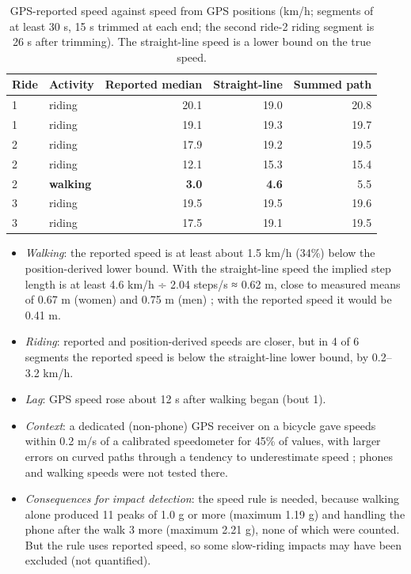 \begin{table}[htbp]
\centering\small
\caption{GPS-reported speed against speed from GPS positions (km/h; segments of at least
30 s, 15 s trimmed at each end; the second ride-2 riding segment is 26 s after trimming).
The straight-line speed is a lower bound on the true speed.}\label{tab:Bgps}
\begin{tabular}{@{}llrrr@{}}
\toprule
Ride & Activity & Reported median & Straight-line & Summed path \\
\midrule
1 & riding & 20.1 & 19.0 & 20.8 \\
1 & riding & 19.1 & 19.3 & 19.7 \\
2 & riding & 17.9 & 19.2 & 19.5 \\
2 & riding & 12.1 & 15.3 & 15.4 \\
2 & \textbf{walking} & \textbf{3.0} & \textbf{4.6} & 5.5 \\
3 & riding & 19.5 & 19.5 & 19.6 \\
3 & riding & 17.5 & 19.1 & 19.5 \\
\bottomrule
\end{tabular}
\end{table}

\begin{itemize}
\item \emph{Walking}: the reported speed is at least about 1.5 km/h (34\%) below the
  position-derived lower bound. With the straight-line speed the implied step length is
  at least 4.6 km/h ÷ 2.04 steps/s ≈ 0.62 m, close to measured means of 0.67 m (women) and
  0.75 m (men) \autocite{pachi2005}; with the reported speed it would be 0.41 m.
\item \emph{Riding}: reported and position-derived speeds are closer, but in 4 of 6 segments
  the reported speed is below the straight-line lower bound, by 0.2--3.2 km/h.
\item \emph{Lag}: GPS speed rose about 12 s after walking began (bout 1).
\item \emph{Context}: a dedicated (non-phone) GPS receiver on a bicycle gave speeds within
  0.2 m/s of a calibrated speedometer for 45\% of values, with larger errors on curved
  paths through a tendency to underestimate speed \autocite{witte2004}; phones and walking
  speeds were not tested there.
\item \emph{Consequences for impact detection}: the speed rule is needed, because walking alone
  produced 11 peaks of 1.0 g or more (maximum 1.19 g) and handling the phone after the
  walk 3 more (maximum 2.21 g), none of which were counted. But the rule uses reported
  speed, so some slow-riding impacts may have been excluded (not quantified).
\end{itemize}

